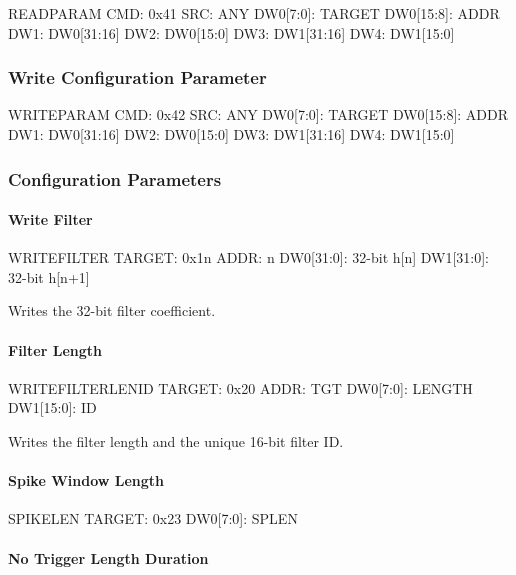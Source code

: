 \begin{event}{READPARAM}
CMD: 0x41
SRC: ANY
DW0[7:0]: TARGET
DW0[15:8]: ADDR
DW1: DW0[31:16]
DW2: DW0[15:0]
DW3: DW1[31:16]
DW4: DW1[15:0]
\end{event}


\subsubsection{Write Configuration Parameter}

\begin{event}{WRITEPARAM}
CMD: 0x42
SRC: ANY
DW0[7:0]: TARGET
DW0[15:8]: ADDR
DW1: DW0[31:16]
DW2: DW0[15:0]
DW3: DW1[31:16]
DW4: DW1[15:0]
\end{event}


\subsubsection{Configuration Parameters}

\paragraph{Write Filter}
\begin{dspcmd}{WRITEFILTER}
TARGET: 0x1n
ADDR: n
DW0[31:0]: 32-bit h[n]
DW1[31:0]: 32-bit h[n+1]
\end{dspcmd}


Writes the 32-bit filter coefficient. 

\paragraph{Filter Length}

\begin{dspcmd}{WRITEFILTERLENID}
TARGET: 0x20
ADDR: TGT
DW0[7:0]: LENGTH
DW1[15:0]: ID
\end{dspcmd}
Writes the filter length and the unique 16-bit filter ID. 

\paragraph{Spike Window Length}

\begin{dspcmd}{SPIKELEN}
TARGET: 0x23
DW0[7:0]: SPLEN
\end{dspcmd}

\paragraph{No Trigger Length Duration}

